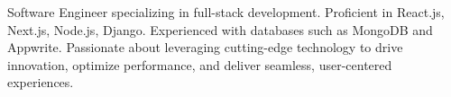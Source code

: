

Software Engineer specializing in full-stack development. Proficient in React.js, Next.js, Node.js, Django. Experienced with databases such as MongoDB and Appwrite.
Passionate about leveraging cutting-edge technology to drive innovation, optimize performance, and deliver seamless, user-centered experiences.

